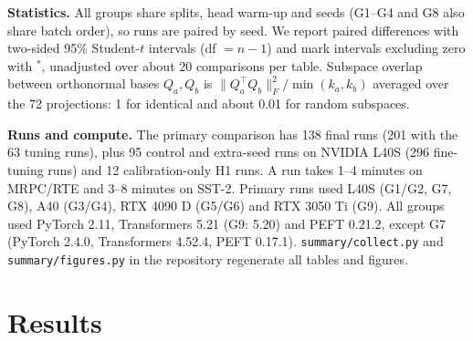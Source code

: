 \documentclass[letterpaper]{article} %
\newcommand{\norm}[1]{\lVert #1\rVert}
\begin{document}
\textbf{Statistics.} All groups share splits, head warm-up and seeds (G1--G4 and G8 also share batch order), so runs are paired by seed. We report paired differences with two-sided 95\% Student-$t$ intervals (df $=n-1$) and mark intervals excluding zero with $^{*}$, unadjusted over about 20 comparisons per table. Subspace overlap between orthonormal bases $Q_a,Q_b$ is $\norm{Q_a^\top Q_b}_F^2/\min(k_a,k_b)$ averaged over the 72 projections: 1 for identical and about 0.01 for random subspaces.

\textbf{Runs and compute.} The primary comparison has 138 final runs (201 with the 63 tuning runs), plus 95 control and extra-seed runs on NVIDIA L40S (296 fine-tuning runs) and 12 calibration-only H1 runs. A run takes 1--4 minutes on MRPC/RTE and 3--8 minutes on SST-2. Primary runs used L40S (G1/G2, G7, G8), A40 (G3/G4), RTX 4090 D (G5/G6) and RTX 3050 Ti (G9). All groups used PyTorch 2.11, Transformers 5.21 (G9: 5.20) and PEFT 0.21.2, except G7 (PyTorch 2.4.0, Transformers 4.52.4, PEFT 0.17.1). \texttt{summary/collect.py} and \texttt{summary/figures.py} in the repository regenerate all tables and figures.

\section{Results}
\end{document}
